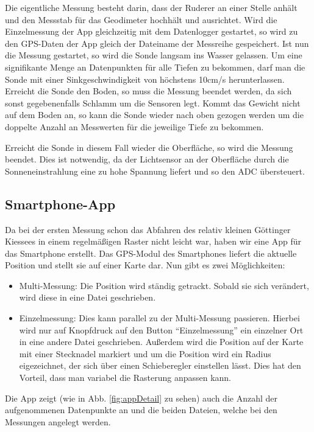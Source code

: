 \documentclass[12pt,a4paper,titlepage,headinclude,bibtotoc]{scrartcl}
\begin{document}
Die eigentliche Messung besteht darin, dass der Ruderer an einer Stelle anhält und den Messstab für das Geodimeter hochhält und ausrichtet.
Wird die Einzelmessung der App gleichzeitig mit dem Datenlogger gestartet, so wird zu den GPS-Daten der App gleich der Dateiname der Messreihe gespeichert.
Ist nun die Messung gestartet, so wird die Sonde langsam ins Wasser gelassen.
Um eine signifikante Menge an Datenpunkten für alle Tiefen zu bekommen, darf man die Sonde mit einer Sinkgeschwindigkeit von höchstens 10cm/s herunterlassen.
Erreicht die Sonde den Boden, so muss die Messung beendet werden, da sich sonst gegebenenfalls Schlamm um die Sensoren legt.
Kommt das Gewicht nicht auf dem Boden an, so kann die Sonde wieder nach oben gezogen werden um die doppelte Anzahl an Messwerten für die jeweilige Tiefe zu bekommen.

Erreicht die Sonde in diesem Fall wieder die Oberfläche, so wird die Messung beendet.
Dies ist notwendig, da der Lichtsensor an der Oberfläche durch die Sonneneinstrahlung eine zu hohe Spannung liefert und so den ADC übersteuert.

\subsection{Smartphone-App}
\label{sec:app}
Da bei der ersten Messung schon das Abfahren des relativ kleinen Göttinger Kiessees in einem regelmäßigen Raster nicht leicht war, haben wir eine App für das Smartphone erstellt.
Das GPS-Modul des Smartphones liefert die aktuelle Position und stellt sie auf einer Karte dar.
Nun gibt es zwei Möglichkeiten:
\begin{itemize}
	\item Multi-Messung: Die Position wird ständig getrackt.
		Sobald sie sich verändert, wird diese in eine Datei geschrieben.
	\item Einzelmessung: Dies kann parallel zu der Multi-Messung passieren.
		Hierbei wird nur auf Knopfdruck auf den Button "`Einzelmessung"' ein einzelner Ort in eine andere Datei geschrieben.
		Außerdem wird die Position auf der Karte mit einer Stecknadel markiert und um die Position wird ein Radius eigezeichnet, der sich über einen Schieberegler einstellen lässt.
		Dies hat den Vorteil, dass man variabel die Rasterung anpassen kann.
\end{itemize}

Die App zeigt (wie in Abb. \ref{fig:appDetail} zu sehen) auch die Anzahl der aufgenommenen Datenpunkte an und die beiden Dateien, welche bei den Messungen angelegt werden.
\end{document}
